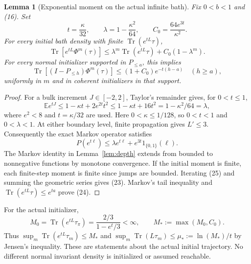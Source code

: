 \documentclass[11pt]{article}
\newtheorem{lemma}[theorem]{Lemma}
\newcommand{\Tr}{\operatorname{Tr}}
\newcommand{\E}{\mathbb E}
\begin{document}
\begin{lemma}[Exponential moment on the actual infinite bath]\label{lem:moment}
Fix $0<b<1$ and (16). Set
\[
 t=\frac{\kappa}{32},\qquad
 \lambda=1-\frac{\kappa^2}{64},\qquad
 C_0=\frac{64e^{3t}}{\kappa^2}.
 \tag{22}
\]
For every initial bath density with finite $\Tr(e^{tL}\tau)$,
\[
 \Tr[e^{tL}\Phi^m(\tau)]
 \le\lambda^m\Tr(e^{tL}\tau)+C_0(1-\lambda^m).
 \tag{23}
\]
For every normal initializer supported in $P_{\le a}$, this implies
\[
 \Tr[(I-P_{\le h})\Phi^m(\tau)]
 \le(1+C_0)e^{-t(h-a)}\quad(h\ge a),
 \tag{24}
\]
uniformly in $m$ and in coherent initializers in that support.
\end{lemma}
\begin{proof}
For a bulk increment $J\in[-2,2]$, Taylor's remainder gives, for $0<t\le1$,
\[
 \E e^{tJ}\le1-\kappa t+2e^{2t}t^2
 \le1-\kappa t+16t^2=1-\kappa^2/64=\lambda,
\]
where $e^2<8$ and $t=\kappa/32$ are used. Here
$0<\kappa\le1/128$, so $0<t<1$ and $0<\lambda<1$.
At either boundary level, finite propagation gives $L'\le3$.
Consequently the exact Markov operator satisfies
\[
 P(e^{t\ell})\le\lambda e^{t\ell}+e^{3t}1_{\{0,1\}}(\ell).
 \tag{25}
\]
The Markov identity in Lemma~\ref{lem:depth} extends from bounded to
nonnegative functions by monotone convergence. If the initial moment is
finite, each finite-step moment is finite since jumps are bounded. Iterating
(25) and summing the geometric series gives (23). Markov's tail inequality
and $\Tr(e^{tL}\tau)\le e^{ta}$ prove (24).
\end{proof}

For the actual initializer,
\[
 M_0=\Tr(e^{tL}\tau_\pi)=\frac{2/3}{1-e^t/3}<\infty,
 \qquad M_*:=\max(M_0,C_0).
 \tag{26}
\]
Thus $\sup_m\Tr(e^{tL}\tau_m)\le M_*$ and
$\sup_m\Tr(L\tau_m)\le\mu_*:=\ln(M_*)/t$ by Jensen's inequality.
These are statements about the actual initial trajectory. No different
normal invariant density is initialized or assumed reachable.
\end{document}
